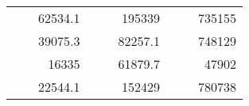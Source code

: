\begin{table}[H]
\begin{tabular}{|ccrccrccc}
\rowcolor[HTML]{DDFDFF} 
\multicolumn{1}{|c|}{\cellcolor[HTML]{FFFFC7}}                                & \multicolumn{1}{c|}{\cellcolor[HTML]{DDFDFF}}                      & \multicolumn{1}{r|}{\cellcolor[HTML]{DAE8FC}62534.1}   & \multicolumn{1}{c|}{\cellcolor[HTML]{FFFFC7}}                                & \multicolumn{1}{c|}{\cellcolor[HTML]{DDFDFF}}                       & \multicolumn{1}{r|}{\cellcolor[HTML]{DDFDFF}195339}    & \multicolumn{1}{c|}{\cellcolor[HTML]{FFFFC7}}                                & \multicolumn{1}{c|}{\cellcolor[HTML]{DDFDFF}}                      & \multicolumn{1}{r|}{\cellcolor[HTML]{DDFDFF}735155}    \\ \cline{3-3} \cline{6-6} \cline{9-9} 
\multicolumn{1}{|c|}{\cellcolor[HTML]{FFFFC7}}                                & \multicolumn{1}{c|}{\cellcolor[HTML]{DDFDFF}}                      & \multicolumn{1}{r|}{\cellcolor[HTML]{DDFDFF}39075.3}   & \multicolumn{1}{c|}{\cellcolor[HTML]{FFFFC7}}                                & \multicolumn{1}{c|}{\cellcolor[HTML]{DDFDFF}}                       & \multicolumn{1}{r|}{\cellcolor[HTML]{DAE8FC}82257.1}   & \multicolumn{1}{c|}{\cellcolor[HTML]{FFFFC7}}                                & \multicolumn{1}{c|}{\cellcolor[HTML]{DDFDFF}}                      & \multicolumn{1}{r|}{\cellcolor[HTML]{DAE8FC}748129}    \\ \cline{3-3} \cline{6-6} \cline{9-9} 
\rowcolor[HTML]{DDFDFF} 
\multicolumn{1}{|c|}{\cellcolor[HTML]{FFFFC7}}                                & \multicolumn{1}{c|}{\cellcolor[HTML]{DDFDFF}}                      & \multicolumn{1}{r|}{\cellcolor[HTML]{DAE8FC}16335}     & \multicolumn{1}{c|}{\cellcolor[HTML]{FFFFC7}}                                & \multicolumn{1}{c|}{\cellcolor[HTML]{DDFDFF}}                       & \multicolumn{1}{r|}{\cellcolor[HTML]{DDFDFF}61879.7}   & \multicolumn{1}{c|}{\cellcolor[HTML]{FFFFC7}}                                & \multicolumn{1}{c|}{\cellcolor[HTML]{DDFDFF}}                      & \multicolumn{1}{r|}{\cellcolor[HTML]{DDFDFF}47902}     \\ \cline{3-3} \cline{6-6} \cline{9-9} 
\multicolumn{1}{|c|}{\cellcolor[HTML]{FFFFC7}}                                & \multicolumn{1}{c|}{\cellcolor[HTML]{DDFDFF}}                      & \multicolumn{1}{r|}{\cellcolor[HTML]{DDFDFF}22544.1}   & \multicolumn{1}{c|}{\cellcolor[HTML]{FFFFC7}}                                & \multicolumn{1}{c|}{\cellcolor[HTML]{DDFDFF}}                       & \multicolumn{1}{r|}{\cellcolor[HTML]{DAE8FC}152429}    & \multicolumn{1}{c|}{\cellcolor[HTML]{FFFFC7}}                                & \multicolumn{1}{c|}{\cellcolor[HTML]{DDFDFF}}                      & \multicolumn{1}{r|}{\cellcolor[HTML]{DAE8FC}780738}    \\ \cline{3-3} \cline{6-6} \cline{9-9} 

\end{tabular}
\end{table}

